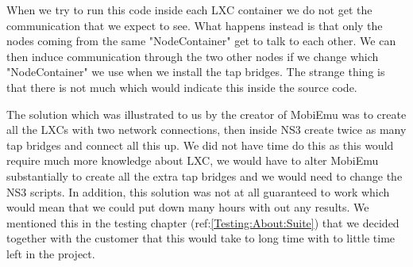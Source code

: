 	When we try to run this code inside each LXC container we do not get the communication that we expect to see. What happens instead is that only the nodes coming from the same "NodeContainer" get to talk to each other. We can then induce communication through the two other nodes if we change which "NodeContainer" we use when we install the tap bridges. The strange thing is that there is not much which would indicate this inside the source code.
	
	The solution which was illustrated to us by the creator of MobiEmu was to create all the LXCs with two network connections, then inside NS3 create twice as many tap bridges and connect all this up. We did not have time do this as this would require much more knowledge about LXC, we would have to alter MobiEmu substantially to create all the extra tap bridges and we would need to change the NS3 scripts. In addition, this solution was not at all guaranteed to work which would mean that we could put down many hours with out any results. We mentioned this in the testing chapter (ref:\ref{Testing:About:Suite}) that we decided together with the customer that this would take to long time with to little time left in the project.
